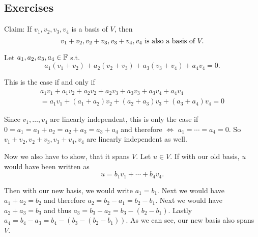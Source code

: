 \subsection{Exercises}

\setcounter{xrcs}{5}

\begin{xrcs}
   Claim: If $v_1, v_2, v_3, v_4$ is a basis of $V$, then
  \begin{equation}
    v_1 + v_2, v_2 + v_3, v_3+v_4, v_4 $ is also a basis of $V.
  \end{equation}
  
  
  \begin{prf}
    Let $a_1, a_2, a_3, a_4 \in \mathbb{F}$ s.t.
    \begin{equation*}
      a_1 (v_1+v_2) + a_2(v_2+v_3) + a_3(v_3+v_4)+a_4 v_4 = 0.
    \end{equation*}
    
    This is the case if and only if
    \begin{multline*}
      a_1 v_1 + a_1 v_2 + a_2 v_2 + a_2 v_3 + a_3 v_3 + a_3 v_4 + a_4 v_4 \\
      = a_1 v_1 + (a_1 + a_2) v_2 + (a_2 + a_3) v_3 + (a_3 + a_4)v_4=0
    \end{multline*}
    
    Since $v_1, \ldots, v_4$ are linearly independent, this is only the case if $0 = a_1 = a_1 + a_2 = a_2 + a_3 = a_3 + a_4$ and therefore $\iff$ $a_1 = \cdots = a_4 = 0$. So $v_1 + v_2, v_2 + v_3, v_3+v_4, v_4$ are linearly independent as well.
    
    Now we also have to show, that it spans $V$. Let $u \in V$. If with our old basis, $u$ would have been written as 
    \begin{equation*}
      u = b_1 v_1 + \cdots + b_4 v_4.
    \end{equation*}
    
    Then with our new basis, we would write $a_1 = b_1.$ Next we would have $a_1 + a_2 = b_2$ and therefore $a_2 = b_2 - a_1 = b_2-b_1$. Next we would have $a_2+a_3=b_3$ and thus $a_3= b_3-a_2 = b_3 - (b_2-b_1)$. Lastly $a_4 = b_4-a_3 = b_4-(b_3 - (b_2-b_1))$. As we can see, our new basis also spans $V$.
  \end{prf}
\end{xrcs}


